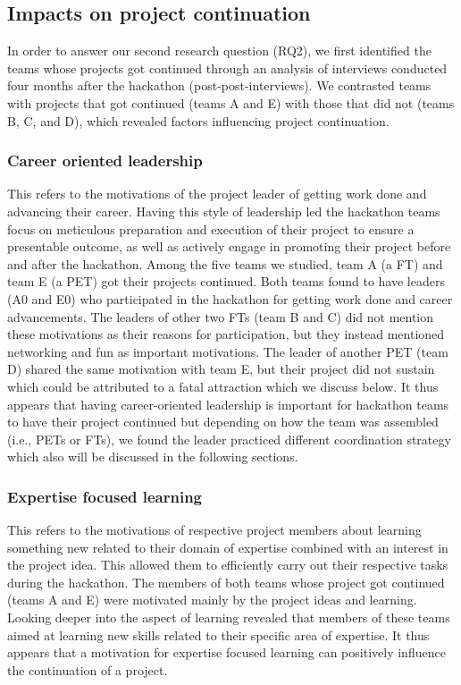 \documentclass{hcij}
\begin{document}
\subsection{Impacts on project continuation}
In order to answer our second research question (RQ2), we first identified the teams whose projects got continued through an analysis of interviews conducted four months after the hackathon (post-post-interviews). We contrasted teams with projects that got continued (teams A and E) with those that did not (teams B, C, and D), which revealed factors influencing project continuation.

\subsubsection{Career oriented leadership}
This refers to the motivations of the project leader of getting work done and advancing their career. Having this style of leadership led the hackathon teams focus on meticulous preparation and execution of their project to ensure a presentable outcome, as well as actively engage in promoting their project before and after the hackathon. Among the five teams we studied, team A (a FT) and team E (a PET) got their projects continued. Both teams found to have leaders (A0 and E0) who participated in the hackathon for getting work done and career advancements. The leaders of other two FTs (team B and C) did not mention these motivations as their reasons for participation, but they instead mentioned networking and fun as important motivations. The leader of another PET (team D) shared the same motivation with team E, but their project did not sustain which could be attributed to a fatal attraction which we discuss below. It thus appears that having career-oriented leadership is important for hackathon teams to have their project continued but depending on how the team was assembled (i.e., PETs or FTs), we found the leader practiced different coordination strategy which also will be discussed in the following sections.

\subsubsection{Expertise focused learning}
This refers to the motivations of respective project members about learning something new related to their domain of expertise combined with an interest in the project idea. This allowed them to efficiently carry out their respective tasks during the hackathon. The members of both teams whose project got continued (teams A and E) were motivated mainly by the project ideas and learning. Looking deeper into the aspect of learning revealed that members of these teams aimed at learning new skills related to their specific area of expertise. It thus appears that a motivation for expertise focused learning can positively influence the continuation of a project.
\end{document}
